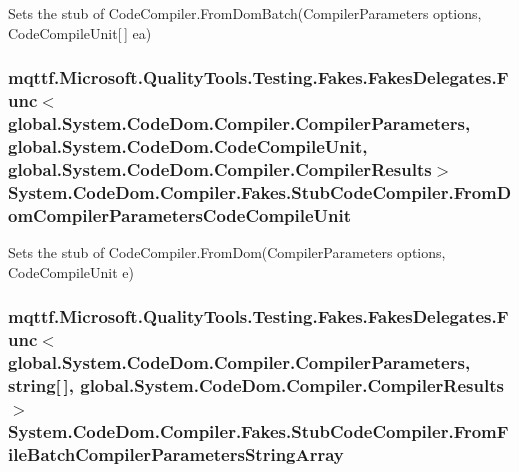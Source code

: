 Sets the stub of Code\-Compiler.\-From\-Dom\-Batch(\-Compiler\-Parameters options, Code\-Compile\-Unit\mbox{[}$\,$\mbox{]} ea)

\hypertarget{class_system_1_1_code_dom_1_1_compiler_1_1_fakes_1_1_stub_code_compiler_aa809ba1ccd9ad11400f74dd1ef97be1c}{
\subsubsection[{From\-Dom\-Compiler\-Parameters\-Code\-Compile\-Unit}]{\setlength{\rightskip}{0pt plus 5cm}mqttf.\-Microsoft.\-Quality\-Tools.\-Testing.\-Fakes.\-Fakes\-Delegates.\-Func$<$global.\-System.\-Code\-Dom.\-Compiler.\-Compiler\-Parameters, global.\-System.\-Code\-Dom.\-Code\-Compile\-Unit, global.\-System.\-Code\-Dom.\-Compiler.\-Compiler\-Results$>$ System.\-Code\-Dom.\-Compiler.\-Fakes.\-Stub\-Code\-Compiler.\-From\-Dom\-Compiler\-Parameters\-Code\-Compile\-Unit}}\label{class_system_1_1_code_dom_1_1_compiler_1_1_fakes_1_1_stub_code_compiler_aa809ba1ccd9ad11400f74dd1ef97be1c}


Sets the stub of Code\-Compiler.\-From\-Dom(\-Compiler\-Parameters options, Code\-Compile\-Unit e)

\hypertarget{class_system_1_1_code_dom_1_1_compiler_1_1_fakes_1_1_stub_code_compiler_a4670a43c3d5108460fc358f498dafbd4}{
\subsubsection[{From\-File\-Batch\-Compiler\-Parameters\-String\-Array}]{\setlength{\rightskip}{0pt plus 5cm}mqttf.\-Microsoft.\-Quality\-Tools.\-Testing.\-Fakes.\-Fakes\-Delegates.\-Func$<$global.\-System.\-Code\-Dom.\-Compiler.\-Compiler\-Parameters, string\mbox{[}$\,$\mbox{]}, global.\-System.\-Code\-Dom.\-Compiler.\-Compiler\-Results$>$ System.\-Code\-Dom.\-Compiler.\-Fakes.\-Stub\-Code\-Compiler.\-From\-File\-Batch\-Compiler\-Parameters\-String\-Array}}\label{class_system_1_1_code_dom_1_1_compiler_1_1_fakes_1_1_stub_code_compiler_a4670a43c3d5108460fc358f498dafbd4}


